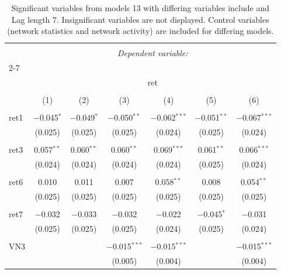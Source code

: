 
\begin{table}[!htbp] \centering 
  \caption{Significant variables from models 13 with differing variables include 
                               and Lag length 7. Insignificant variables are not displayed. 
                               Control variables (network statistics and network activity) are 
                               included for differing models.} 
  \label{Returnmodels1_t} 
\scriptsize 
\begin{tabular}{@{\extracolsep{5pt}}lcccccc} 
\\[-1.8ex]\hline 
\hline \\[-1.8ex] 
 & \multicolumn{6}{c}{\textit{Dependent variable:}} \\ 
\cline{2-7} 
\\[-1.8ex] & \multicolumn{6}{c}{ret} \\ 
\\[-1.8ex] & (1) & (2) & (3) & (4) & (5) & (6)\\ 
\hline \\[-1.8ex] 
 ret1 & $-$0.045$^{*}$ & $-$0.049$^{*}$ & $-$0.050$^{**}$ & $-$0.062$^{***}$ & $-$0.051$^{**}$ & $-$0.067$^{***}$ \\ 
  & (0.025) & (0.025) & (0.025) & (0.024) & (0.025) & (0.024) \\ 
  & & & & & & \\ 
 ret3 & 0.057$^{**}$ & 0.060$^{**}$ & 0.060$^{**}$ & 0.069$^{***}$ & 0.061$^{**}$ & 0.066$^{***}$ \\ 
  & (0.024) & (0.024) & (0.024) & (0.024) & (0.025) & (0.024) \\ 
  & & & & & & \\ 
 ret6 & 0.010 & 0.011 & 0.007 & 0.058$^{**}$ & 0.008 & 0.054$^{**}$ \\ 
  & (0.025) & (0.025) & (0.025) & (0.025) & (0.025) & (0.025) \\ 
  & & & & & & \\ 
 ret7 & $-$0.032 & $-$0.033 & $-$0.032 & $-$0.022 & $-$0.045$^{*}$ & $-$0.031 \\ 
  & (0.025) & (0.025) & (0.025) & (0.024) & (0.025) & (0.024) \\ 
  & & & & & & \\ 
 VN3 &  &  & $-$0.015$^{***}$ & $-$0.015$^{***}$ &  & $-$0.015$^{***}$ \\ 
  &  &  & (0.005) & (0.004) &  & (0.004) \\ 

\end{tabular}
\end{table}
